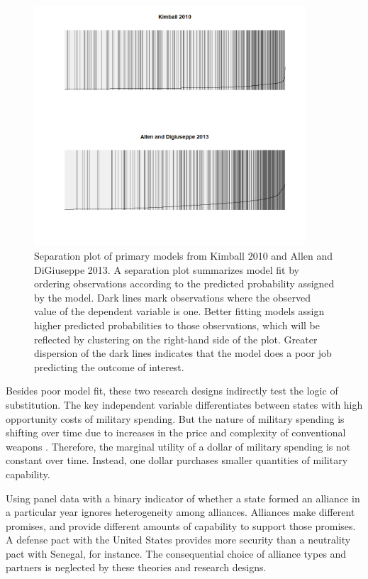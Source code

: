 \documentclass[12pt]{article}
\begin{document}
\begin{figure}[htbp]
	\centering
		\includegraphics[width=0.90\textwidth]{formation sep_plot.png}
	\caption{Separation plot of primary models from Kimball 2010 and Allen and DiGiuseppe 2013. A separation plot summarizes model fit by ordering observations according to the predicted probability assigned by the model. Dark lines mark observations where the observed value of the dependent variable is one. Better fitting models assign higher predicted probabilities to those observations, which will be reflected by clustering on the right-hand side of the plot. Greater dispersion of the dark lines indicates that the model does a poor job predicting the outcome of interest.}
	\label{fig:formation sep_plot}
\end{figure}

Besides poor model fit, these two research designs indirectly test the logic of substitution. The key independent variable differentiates between states with high opportunity costs of military spending. But the nature of military spending is shifting over time due to increases in the price and complexity of conventional weapons \citep{Bitzinger2003}. Therefore, the marginal utility of a dollar of military spending is not constant over time. Instead, one dollar purchases smaller quantities of military capability.
  
Using panel data with a binary indicator of whether a state formed an alliance in a particular year ignores heterogeneity among alliances. Alliances make different promises, and provide different amounts of capability to support those promises. A defense pact with the United States provides more security than a neutrality pact with Senegal, for instance. The consequential choice of alliance types and partners is neglected by these theories and research designs.  
\end{document}
